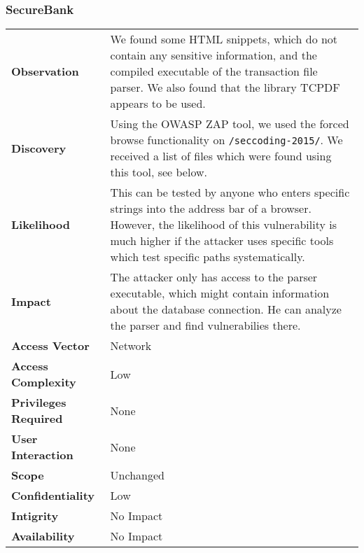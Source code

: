 \subsubsection*{SecureBank}

\begin{tabular}{l|p{10cm}}

\textbf{Observation} & We found some HTML snippets, which do not contain any sensitive information, and the compiled executable of the transaction file parser. We also found that the library TCPDF appears to be used. \\
\textbf{Discovery} & Using the OWASP ZAP tool, we used the forced browse functionality on \texttt{/seccoding-2015/}. We received a list of files which were found using this tool, see below. \\
\textbf{Likelihood} & This can be tested by anyone who enters specific strings into the address bar of a browser. However, the likelihood of this vulnerability is much higher if the attacker uses specific tools which test specific paths systematically. \\
\textbf{Impact} & The attacker only has access to the parser executable, which might contain information about the database connection. He can analyze the parser and find vulnerabilies there. \\
\textbf{Access Vector} & Network \\
\textbf{Access Complexity} & Low \\
\textbf{Privileges Required} & None \\
\textbf{User Interaction} & None \\
\textbf{Scope} & Unchanged \\
\textbf{Confidentiality} & Low \\
\textbf{Intigrity} & No Impact \\
\textbf{Availability} & No Impact \\
\end{tabular}


